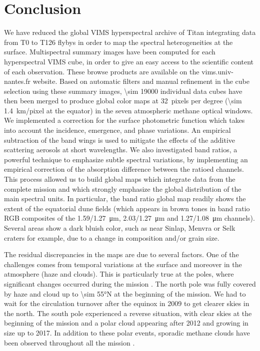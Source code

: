 \documentclass[preprint,twocolumn,5p,authoryear,compress,colorlinks=true]{elsarticle}
\begin{document}
{\section{Conclusion}

We have reduced the global VIMS hyperspectral archive of Titan integrating data from T0 to T126 flybys in order to map the spectral heterogeneities at the surface. Multispectral summary images have been computed for each hyperspectral VIMS cube, in order to give an easy access to the scientific content of each observation. These browse products are available on the vims.univ-nantes.fr website. Based on automatic filters and manual refinement in the cube selection using these summary images, \num{\sim 19000} individual data cubes have then been merged to produce global color maps at \SI{32}{pixels} per degree (\SI{\sim 1.4}{km/pixel} at the equator) in the seven atmospheric methane optical windows. We implemented a correction for the surface photometric function which takes into account the incidence, emergence, and phase variations. An empirical subtraction of the band wings is used to mitigate the effects of the additive scattering aerosols at short wavelengths. We also investigated band ratios, a powerful technique to emphasize subtle spectral variations, by implementing an empirical correction of the absorption difference between the ratioed channels. This process allowed us to build global maps which integrate data from the complete mission and which strongly emphasize the global distribution of the main spectral units. In particular, the band ratio global map readily shows the extent of the equatorial dune fields (which appears in brown tones in band ratio RGB composites of the \SI{1.59/1.27}{\um}, \SI{2.03/1.27}{\um} and \SI{1.27/1.08}{\um} channels). Several areas show a dark bluish color, such as near Sinlap, Menvra or Selk craters for example, due to a change in composition and/or grain size.

The residual discrepancies in the maps are due to several factors. One of the challenges comes from temporal variations at the surface \citep{Barnes2013b, Solomonidou2016} and moreover in the atmosphere (haze and clouds). This is particularly true at the poles, where significant changes occurred during the mission \citep{LeMouelic2018}. The north pole was fully covered by haze and cloud up to \ang{\sim 55}N at the beginning of the mission. We had to wait for the circulation turnover after the equinox in 2009 to get clearer skies in the north. The south pole experienced a reverse situation, with clear skies at the beginning of the mission and a polar cloud appearing after 2012 and growing in size up to 2017. In addition to these polar events, sporadic methane clouds have been observed throughout all the mission \citep[\emph{e.g.,}][]{Rodriguez2009, Rodriguez2011, Turtle2018}.

}
\end{document}
